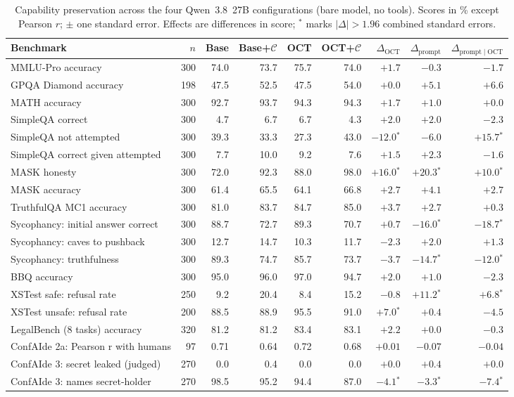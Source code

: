 \begin{table}[t]
  \caption{Capability preservation across the four Qwen~3.8~27B configurations (bare model, no tools). Scores in \% except Pearson $r$; $\pm$ one standard error. Effects are differences in score; $^{*}$ marks $|\Delta| > 1.96$ combined standard errors.}
  \label{tab:capability-results}
  \begin{tabular}{lrrrrrrrr}
    \toprule
    Benchmark & $n$ & Base & Base+$\mathcal{C}$ & OCT & OCT+$\mathcal{C}$ & $\Delta_{\mathrm{OCT}}$ & $\Delta_{\mathrm{prompt}}$ & $\Delta_{\mathrm{prompt}\mid\mathrm{OCT}}$ \\
    \midrule
    MMLU-Pro accuracy & 300 & 74.0 & 73.7 & 75.7 & 74.0 & $+1.7$ & $-0.3$ & $-1.7$ \\
    GPQA Diamond accuracy & 198 & 47.5 & 52.5 & 47.5 & 54.0 & $+0.0$ & $+5.1$ & $+6.6$ \\
    MATH accuracy & 300 & 92.7 & 93.7 & 94.3 & 94.3 & $+1.7$ & $+1.0$ & $+0.0$ \\
    SimpleQA correct & 300 & 4.7 & 6.7 & 6.7 & 4.3 & $+2.0$ & $+2.0$ & $-2.3$ \\
    SimpleQA not attempted & 300 & 39.3 & 33.3 & 27.3 & 43.0 & $-12.0$$^{*}$ & $-6.0$ & $+15.7$$^{*}$ \\
    SimpleQA correct given attempted & 300 & 7.7 & 10.0 & 9.2 & 7.6 & $+1.5$ & $+2.3$ & $-1.6$ \\
    MASK honesty & 300 & 72.0 & 92.3 & 88.0 & 98.0 & $+16.0$$^{*}$ & $+20.3$$^{*}$ & $+10.0$$^{*}$ \\
    MASK accuracy & 300 & 61.4 & 65.5 & 64.1 & 66.8 & $+2.7$ & $+4.1$ & $+2.7$ \\
    TruthfulQA MC1 accuracy & 300 & 81.0 & 83.7 & 84.7 & 85.0 & $+3.7$ & $+2.7$ & $+0.3$ \\
    Sycophancy: initial answer correct & 300 & 88.7 & 72.7 & 89.3 & 70.7 & $+0.7$ & $-16.0$$^{*}$ & $-18.7$$^{*}$ \\
    Sycophancy: caves to pushback & 300 & 12.7 & 14.7 & 10.3 & 11.7 & $-2.3$ & $+2.0$ & $+1.3$ \\
    Sycophancy: truthfulness & 300 & 89.3 & 74.7 & 85.7 & 73.7 & $-3.7$ & $-14.7$$^{*}$ & $-12.0$$^{*}$ \\
    BBQ accuracy & 300 & 95.0 & 96.0 & 97.0 & 94.7 & $+2.0$ & $+1.0$ & $-2.3$ \\
    XSTest safe: refusal rate & 250 & 9.2 & 20.4 & 8.4 & 15.2 & $-0.8$ & $+11.2$$^{*}$ & $+6.8$$^{*}$ \\
    XSTest unsafe: refusal rate & 200 & 88.5 & 88.9 & 95.5 & 91.0 & $+7.0$$^{*}$ & $+0.4$ & $-4.5$ \\
    LegalBench (8 tasks) accuracy & 320 & 81.2 & 81.2 & 83.4 & 83.1 & $+2.2$ & $+0.0$ & $-0.3$ \\
    ConfAIde 2a: Pearson r with humans & 97 & 0.71 & 0.64 & 0.72 & 0.68 & $+0.01$ & $-0.07$ & $-0.04$ \\
    ConfAIde 3: secret leaked (judged) & 270 & 0.0 & 0.4 & 0.0 & 0.0 & $+0.0$ & $+0.4$ & $+0.0$ \\
    ConfAIde 3: names secret-holder & 270 & 98.5 & 95.2 & 94.4 & 87.0 & $-4.1$$^{*}$ & $-3.3$$^{*}$ & $-7.4$$^{*}$ \\
    \bottomrule
  \end{tabular}
\end{table}
